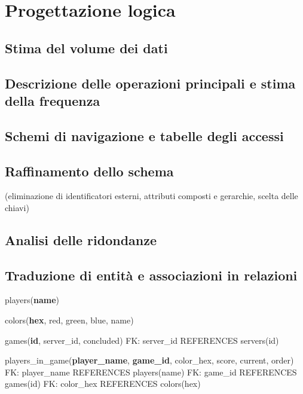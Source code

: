 \section{Progettazione logica}
\subsection{Stima del volume dei dati}

\subsection{Descrizione delle operazioni principali e stima della frequenza}

\subsection{Schemi di navigazione e tabelle degli accessi}

\subsection{Raffinamento dello schema}
(eliminazione di identificatori esterni, attributi composti e gerarchie, scelta delle chiavi)

\subsection{Analisi delle ridondanze}

\subsection{Traduzione di entità e associazioni in relazioni}
players(\textbf{name})\newline

colors(\textbf{hex}, red, green, blue, name)\newline

games(\textbf{id}, server\_id, concluded)\newline
FK: server\_id REFERENCES servers(id)\newline

players\_in\_game(\textbf{player\_name}, \textbf{game\_id}, color\_hex, score, current, order)\newline
FK: player\_name REFERENCES players(name)\newline
FK: game\_id REFERENCES games(id)\newline
FK: color\_hex REFERENCES colors(hex)\newline

